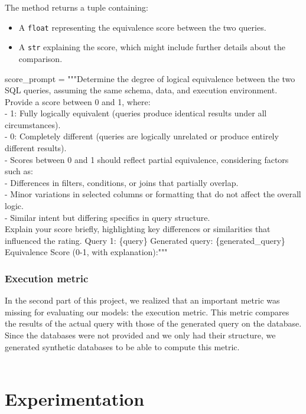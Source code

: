 \documentclass[12pt,a4paper]{article}
\begin{document}
The method returns a tuple containing:
\begin{itemize}
    \item A \texttt{float} representing the equivalence score between the two queries.
    \item A \texttt{str} explaining the score, which might include further details about the comparison.
\end{itemize}


score\_prompt = """Determine the degree of logical equivalence between the two SQL queries, assuming the same schema, data, and execution environment. Provide a score between 0 and 1, where:
\\
- 1: Fully logically equivalent (queries produce identical results under all circumstances).
\\
- 0: Completely different (queries are logically unrelated or produce entirely different results).
\\
- Scores between 0 and 1 should reflect partial equivalence, considering factors such as:
\\
- Differences in filters, conditions, or joins that partially overlap.
\\
- Minor variations in selected columns or formatting that do not affect the overall logic.
\\
- Similar intent but differing specifics in query structure.
\\
Explain your score briefly, highlighting key differences or similarities that influenced the rating.
Query 1:
\{query\}
Generated query:
\{generated\_query\}
Equivalence Score (0-1, with explanation):"""

\subsubsection*{Execution metric}

In the second part of this project, we realized that an important metric was missing for evaluating our models: the execution metric. This metric compares the results of the actual query with those of the generated query on the database.
Since the databases were not provided and we only had their structure, we generated synthetic databases to be able to compute this metric.
\\
\\

\section*{Experimentation}
\end{document}
